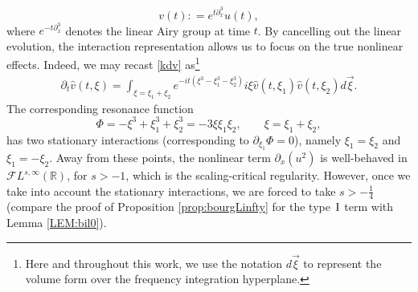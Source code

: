 \documentclass[%
11pt,  reqno]{amsart}
\newcommand{\I}{\hspace{0.2mm}\textup{I}\hspace{0.2mm}}
\newcommand{\5}{\textup{V}}
\newcommand{\FL}{\mathcal{F} L}
\DeclareMathOperator*{\intt}{\int}
\newcommand{\dx}{\partial_x}
\newcommand{\dt}{\partial_t}
\theoremstyle{remark}
\newcommand{\R}{\mathbb{R}}
\numberwithin{equation}{section}
\numberwithin{theorem}{section}
\begin{document}
	\begin{equation}\label{inter}
		v(t) : = e^{t\partial_x^3}u(t),
	\end{equation} 
	where $e^{-t\dx^3}$ denotes the linear Airy group at time $t$. By cancelling out the linear evolution, the interaction representation allows us to focus on the true nonlinear effects. Indeed, we may recast \eqref{kdv} as\footnote{Here and throughout this work, we use the notation $d\vec{\xi}$ to represent the volume form over the frequency integration hyperplane.}
	\begin{align}
		\label{dtv}
		\dt{\widehat{v}}(t,\xi) = \intt_{\xi = \xi_1+\xi_2} e^{-it (\xi^3 -\xi_1^3 -
			\xi^3_2)} i \xi \widehat{v}(t,\xi_1) \widehat{v}(t,\xi_2)  d\vec{\xi}
		.
	\end{align}
	The corresponding resonance function
	\begin{equation}
		\Phi=-\xi^3+\xi_1^3+\xi_2^3 = -3\xi\xi_1\xi_2, \qquad \xi=\xi_1+\xi_2,
	\end{equation}
	has two stationary interactions (corresponding to $\partial_{\xi_1}\Phi=0$), namely $\xi_1=\xi_2$ and $\xi_1=-\xi_2$. Away from these points, the nonlinear term $\partial_x(u^2)$ is well-behaved in $\FL^{s,\infty}(\R)$,
	for $s>-1$, which is the scaling-critical regularity. 
However, once we take into account the stationary interactions, we are forced to take $s>-\frac14$ (compare the proof of Proposition \ref{prop:bourgLinfty} for the type $\I$ term with Lemma \ref{LEM:bil0}).
    
	
\end{document}
